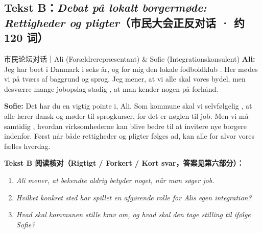 \subsection*{Tekst B：\textit{Debat på lokalt borgermøde: Rettigheder og pligter}（市民大会正反对话 · 约 120 词）}

\begin{emailbox}{市民论坛对话｜Ali (Forældrerepræsentant) \& Sofie (Integrationskonsulent)}
\textbf{Ali:} Jeg har boet i Danmark i seks år, og for mig  den lokale fodboldklub . Her mødes vi på tværs af baggrund og sprog. Jeg mener, at vi alle skal  vores bydel, men desværre  mange jobopslag stadig , at man kender nogen på forhånd.

\textbf{Sofie:} Det har du en vigtig pointe i, Ali. Som kommune skal vi selvfølgelig , at alle lærer dansk og møder til sprogkurser, for det er nøglen til job. Men vi må samtidig , hvordan virksomhederne kan blive bedre til at invitere nye borgere indenfor. Først når både rettigheder og pligter følges ad, kan alle for alvor  vores fælles hverdag.
\end{emailbox}

\textbf{Tekst B 阅读核对（Rigtigt / Forkert / Kort svar，答案见第六部分）：}
\begin{enumerate}
  \item \textit{Ali mener, at bekendte aldrig betyder noget, når man søger job.} \underline{\hspace{2.2cm}}
  \item \textit{Hvilket konkret sted har spillet en afgørende rolle for Alis egen integration?} \underline{\hspace{2.2cm}}
  \item \textit{Hvad skal kommunen stille krav om, og hvad skal den tage stilling til ifølge Sofie?} \underline{\hspace{2.2cm}}
\end{enumerate}


